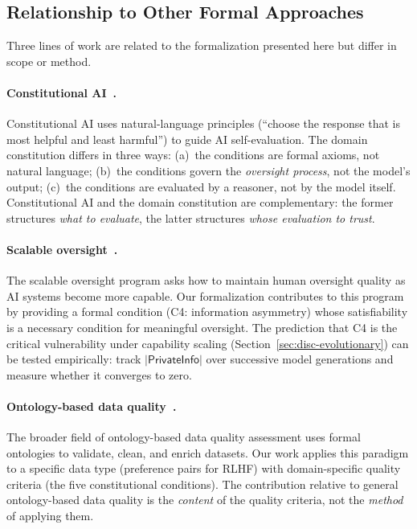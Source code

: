\documentclass[11pt]{article}
\begin{document}
\subsection{Relationship to Other Formal Approaches}
\label{sec:disc-related}

Three lines of work are related to the formalization presented here but differ in scope or method.

\paragraph{Constitutional AI~\citep{bai2022constitutional}.}
Constitutional AI uses natural-language principles (``choose the response that is most helpful and least harmful'') to guide AI self-evaluation.
The domain constitution differs in three ways: (a)~the conditions are formal axioms, not natural language; (b)~the conditions govern the \emph{oversight process}, not the model's output; (c)~the conditions are evaluated by a reasoner, not by the model itself.
Constitutional AI and the domain constitution are complementary: the former structures \emph{what to evaluate}, the latter structures \emph{whose evaluation to trust}.

\paragraph{Scalable oversight~\citep{bowman2022measuring, irving2018ai, leike2018scalable}.}
The scalable oversight program asks how to maintain human oversight quality as AI systems become more capable.
Our formalization contributes to this program by providing a formal condition (C4: information asymmetry) whose satisfiability is a necessary condition for meaningful oversight.
The prediction that C4 is the critical vulnerability under capability scaling (Section~\ref{sec:disc-evolutionary}) can be tested empirically: track $|\mathsf{PrivateInfo}|$ over successive model generations and measure whether it converges to zero.

\paragraph{Ontology-based data quality~\citep{palagin2024ontology}.}
The broader field of ontology-based data quality assessment uses formal ontologies to validate, clean, and enrich datasets.
Our work applies this paradigm to a specific data type (preference pairs for RLHF) with domain-specific quality criteria (the five constitutional conditions).
The contribution relative to general ontology-based data quality is the \emph{content} of the quality criteria, not the \emph{method} of applying them.
\end{document}

